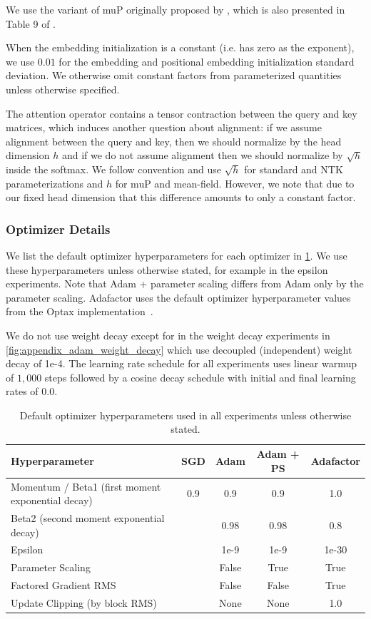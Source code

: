 \documentclass{article}
\theoremstyle{plain}
\theoremstyle{definition}
\theoremstyle{remark}
\begin{document}
We use the variant of muP originally proposed by \citet{yang2021tensoriv}, which is also presented in Table 9 of \citet{yang2022tensorv}.

When the embedding initialization is a constant (i.e. has zero as the exponent), we use $0.01$ for the embedding and positional embedding initialization standard deviation. We otherwise omit constant factors from parameterized quantities unless otherwise specified.

The attention operator contains a tensor contraction between the query and key matrices, which induces another question about alignment: if we assume alignment between the query and key, then we should normalize by the head dimension $h$ and if we do not assume alignment then we should normalize by $\sqrt{h}$ inside the softmax. We follow convention and use $\sqrt{h}$ for standard and NTK parameterizations and $h$ for muP and mean-field. However, we note that due to our fixed head dimension that this difference amounts to only a constant factor.



\subsubsection{Optimizer Details}
\label{app:optim_details}
We list the default optimizer hyperparameters for each optimizer in \cref{tab:optim_hyperparameters}. We use these hyperparameters unless otherwise stated, for example in the epsilon experiments. Note that Adam + parameter scaling differs from Adam only by the parameter scaling. Adafactor uses the default optimizer hyperparameter values from the Optax implementation~\citep{deepmind2020jax}.

We do not use weight decay except for in the weight decay experiments in \cref{fig:appendix_adam_weight_decay} which use decoupled (independent) weight decay of 1e-4. The learning rate schedule for all experiments uses linear warmup of $1{,}000$ steps followed by a cosine decay schedule with initial and final learning rates of $0.0$.

\begin{table}[h!]
\centering
\caption{Default optimizer hyperparameters used in all experiments unless otherwise stated.}
\label{tab:optim_hyperparameters}
\begin{tabular}{lcccc} %
\toprule
\textbf{Hyperparameter} & \textbf{SGD} & \textbf{Adam} & \textbf{Adam + PS} & \textbf{Adafactor} \\ 
\midrule
Momentum / Beta1 (first moment exponential decay) & 0.9 & 0.9 & 0.9 &  1.0 \\ 
Beta2 (second moment exponential decay) &  & 0.98 & 0.98 & 0.8 \\ 
Epsilon &  & 1e-9 & 1e-9 & 1e-30 \\ 
Parameter Scaling &  & False & True & True \\ 
Factored Gradient RMS &  & False & False & True \\ 
Update Clipping (by block RMS) &  & None & None & 1.0 \\ 
\bottomrule
\end{tabular}
\end{table}
\clearpage
\end{document}
